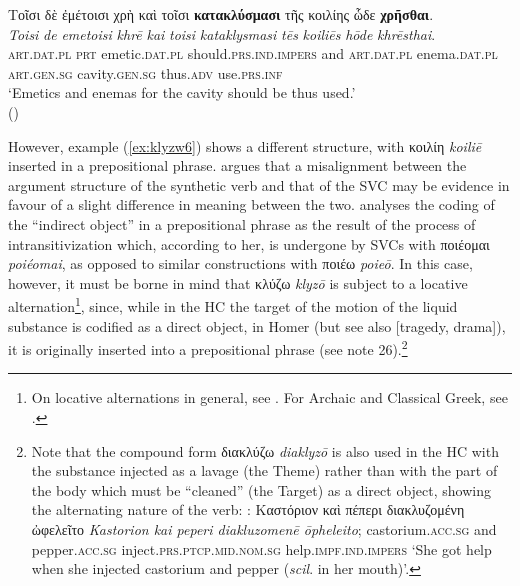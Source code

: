 \documentclass[output=paper,colorlinks,citecolor=brown]{langscibook}
\begin{document}
\begin{exe}
\ex\label{ex:klyzw5}
\glll Τοῖσι δὲ ἐμέτοισι χρὴ καὶ τοῖσι \textbf{κατακλύσμασι} τῆς κοιλίης ὧδε \textbf{χρῆσθαι}. \\ 
\textit{Toisi} \textit{de} \textit{emetoisi} \textit{khrē} \textit{kai} \textit{toisi} \textit{kataklysmasi} \textit{tēs} \textit{koiliēs} \textit{hōde} \textit{khrēsthai}. \\
\textsc{art.dat.pl} \textsc{prt} emetic.\textsc{dat.pl} should.\textsc{prs.ind.impers} and \textsc{art.dat.pl} enema.\textsc{dat.pl} \textsc{art.gen.sg} cavity.\textsc{gen.sg} thus.\textsc{adv} use.\textsc{prs.inf} \\
\glt ‘Emetics and enemas for the cavity should be thus used.' \\
\hspace*{\fill}()
\end{exe}

However, example (\ref{ex:klyzw6}) shows a different structure, with κοιλίη \textit{koiliē} inserted in a prepositional phrase. \citet{langer2004linguistic} argues that a misalignment between the argument structure of the synthetic verb and that of the SVC may be evidence in favour of a slight difference in meaning between the two. \citet[174--175]{Marini2010} analyses the coding of the “indirect object” in a prepositional phrase as the result of the process of intransitivization which, according to her, is undergone by SVCs with ποιέομαι \textit{poiéomai}, as opposed to similar constructions with ποιέω \textit{poieō}. In this case, however, it must be borne in mind that κλύζω \textit{klyzō} is subject to a locative alternation\footnote{On locative alternations in general, see \citet[350--351]{Levin1993}. For Archaic and Classical Greek, see \citet[540--541]{DelaVilla2017}.}, since, while in the HC the target of the motion of the liquid substance is codified as a direct object, in Homer (but see also  [tragedy, drama]), it is originally inserted into a prepositional phrase (see note 26).\largerpage[1.5]\footnote{Note that the compound form διακλύζω \textit{diaklyzō} is also used in the HC with the substance injected as a lavage (the Theme) rather than with the part of the body which must be “cleaned” (the Target) as a direct object, showing the alternating nature of the verb: : Καστόριον καὶ πέπερι διακλυζομένη ὠφελεῖτο \textit{Kastorion kai peperi diakluzomenē ōpheleito}; castorium.\textsc{acc.sg} and pepper.\textsc{acc.sg} inject.\textsc{prs.ptcp.mid.nom.sg} help.\textsc{impf.ind.impers} ‘She got help when she injected castorium and pepper (\textit{scil}. in her mouth)’.}
\end{document}
